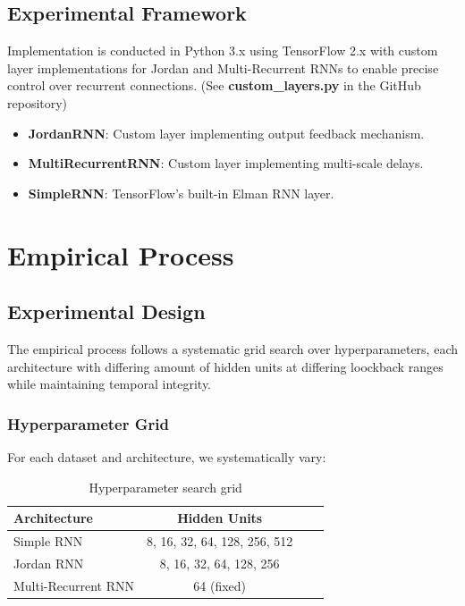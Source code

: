 \documentclass[conference]{IEEEtran}
\begin{document}
\subsection{Experimental Framework}

Implementation is conducted in Python 3.x using TensorFlow 2.x with
custom layer implementations for Jordan and Multi-Recurrent RNNs to
enable precise control over recurrent connections.
(See \textbf{custom\_layers.py} in the GitHub repository)

\begin{itemize}
    \item \textbf{JordanRNN}: Custom layer implementing output
    feedback mechanism.
    \item \textbf{MultiRecurrentRNN}: Custom layer implementing
    multi-scale delays.
    \item \textbf{SimpleRNN}: TensorFlow's built-in Elman RNN layer.
\end{itemize}


\section{Empirical Process}
\label{sec:empirical}

\subsection{Experimental Design}

The empirical process follows a systematic grid search over
hyperparameters, each architecture with differing amount of 
hidden units at differing loockback ranges while maintaining
temporal integrity.

\subsubsection{Hyperparameter Grid}

For each dataset and architecture, we systematically vary:

\begin{table}[H]
\centering
\caption{Hyperparameter search grid}
\label{tab:hyperparams}
\begin{tabular}{lccc}
\toprule
\textbf{Architecture} & \textbf{Hidden Units} \\
\midrule
Simple RNN & 8, 16, 32, 64, 128, 256, 512 \\
Jordan RNN & 8, 16, 32, 64, 128, 256 \\
Multi-Recurrent RNN & 64 (fixed) \\
\bottomrule
\end{tabular}
\end{table}
\end{document}
